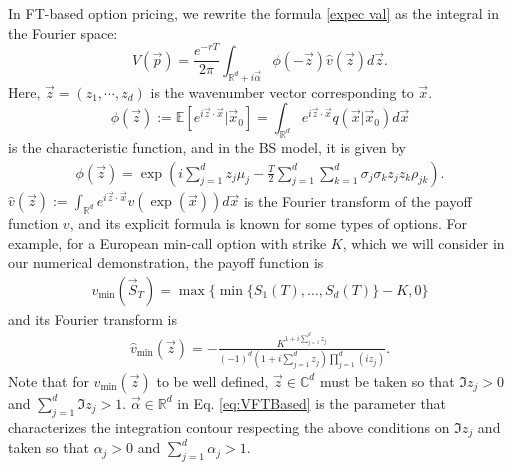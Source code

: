 In FT-based option pricing, we rewrite the formula \eqref{expec val} as the integral in the Fourier space:
\begin{equation}
V(\vec{p}) = \frac{e^{-rT}}{2\pi} \int_{\mathbb{R}^d+i\vec{\alpha}}\phi(-\vec{z})\hat{v}(\vec{z})d\vec{z}. 
\label{eq:VFTBased}
\end{equation}
Here, $\vec{z}=(z_1,\cdots,z_d)$ is the wavenumber vector corresponding to $\vec{x}$.
\begin{equation}
\phi(\vec{z}):=\mathbb{E}[e^{i\vec{z}\cdot\vec{x}}|\vec{x}_0]=\int_{\mathbb{R}^d} e^{i\vec{z}\cdot\vec{x}}q(\vec{x}|\vec{x}_0)d\vec{x}    
\end{equation}
is the characteristic function, and in the BS model, it is given by
\begin{align}
    \phi(\vec{z}) = \exp \left(i \sum_{j=1}^d z_j \mu_j-
    \frac{T}{2} \sum_{j=1}^d \sum_{k=1}^d \sigma_j \sigma_k z_j z_k \rho_{j k}\right). 
\label{eq:phi_tt}
\end{align}
$\hat{v}(\vec{z}):=\int_{\mathbb{R}^d} e^{i\vec{z}\cdot\vec{x}}v(\exp(\vec{x}))d\vec{x}$ is the Fourier transform of the payoff function $v$, and its explicit formula is known for some types of options.
For example, for a European min-call option with strike $K$, which we will consider in our numerical demonstration, the payoff function is
\begin{align}
    v_{\text{min}}(\vec{S}_T) = \max\{\min\{S_{1}(T), \ldots, S_{d}(T)\} - K, 0\}
\label{min option}
\end{align}
and its Fourier transform is \cite{Eberlein2010}
\begin{align}
    \hat{v}_{\min }(\vec{z})=-\frac{K^{1+i \sum_{j=1}^d z_j}}{(-1)^d\left(1+i \sum_{j=1}^d z_j\right) \prod_{j=1}^d (i z_j)}.
\label{eq:vmin_tt}
\end{align}
Note that for $\hat{v}_{\min }(\vec{z})$ to be well defined, $\vec{z}\in\mathbb{C}^d$ must be taken so that $\Im z_j>0$ and $\sum_{j=1}^d \Im z_j > 1$.
$\vec{\alpha}\in\mathbb{R}^d$ in Eq. \eqref{eq:VFTBased} is the parameter that characterizes the integration contour respecting the above conditions on $\Im z_j$ and taken so that $\alpha_j>0$ and $\sum_{j=1}^d \alpha_j > 1$.

